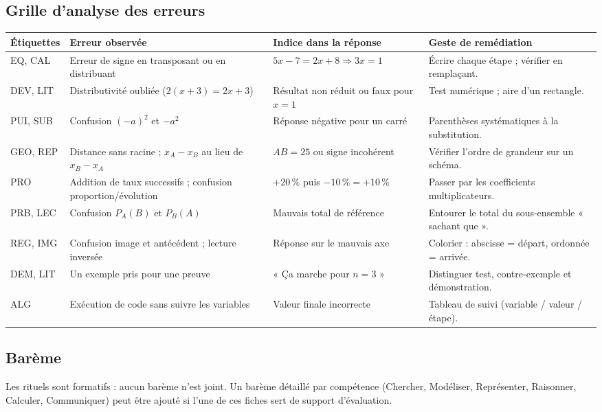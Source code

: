 \subsection*{Grille d'analyse des erreurs}
{\footnotesize{}
\begin{tabular}{@{}p{2.2cm} p{4.4cm} p{4.8cm} p{4.4cm}@{}}\toprule
Étiquettes & Erreur observée & Indice dans la réponse & Geste de remédiation \\ \midrule
EQ, CAL & Erreur de signe en transposant ou en distribuant & $5x-7=2x+8\Rightarrow3x=1$ & Écrire chaque étape ; vérifier en remplaçant. \\
DEV, LIT & Distributivité oubliée ($2(x+3)=2x+3$) & Résultat non réduit ou faux pour $x=1$ & Test numérique ; aire d'un rectangle. \\
PUI, SUB & Confusion $(-a)^2$ et $-a^2$ & Réponse négative pour un carré & Parenthèses systématiques à la substitution. \\
GEO, REP & Distance sans racine ; $x_A-x_B$ au lieu de $x_B-x_A$ & $AB=25$ ou signe incohérent & Vérifier l'ordre de grandeur sur un schéma. \\
PRO & Addition de taux successifs ; confusion proportion/évolution & $+20\,\%$ puis $-10\,\%=+10\,\%$ & Passer par les coefficients multiplicateurs. \\
PRB, LEC & Confusion $P_A(B)$ et $P_B(A)$ & Mauvais total de référence & Entourer le total du sous-ensemble « sachant que ». \\
REG, IMG & Confusion image et antécédent ; lecture inversée & Réponse sur le mauvais axe & Colorier : abscisse = départ, ordonnée = arrivée. \\
DEM, LIT & Un exemple pris pour une preuve & « Ça marche pour $n=3$ » & Distinguer test, contre-exemple et démonstration. \\
ALG & Exécution de code sans suivre les variables & Valeur finale incorrecte & Tableau de suivi (variable / valeur / étape). \\ \bottomrule
\end{tabular}}

\subsection*{Barème}
Les rituels sont formatifs : aucun barème n'est joint. Un barème détaillé par compétence (Chercher, Modéliser, Représenter, Raisonner, Calculer, Communiquer) peut être ajouté si l'une de ces fiches sert de support d'évaluation.

